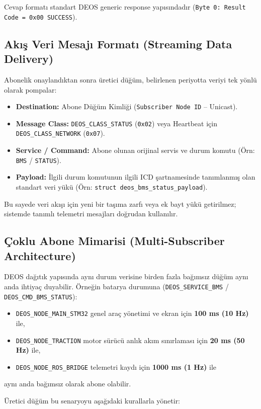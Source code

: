 \documentclass[a4paper,10pt]{article}
\newcommand{\hex}[1]{\texttt{0x#1}}
\newcommand{\code}[1]{\texttt{#1}}
\begin{document}
Cevap formatı standart DEOS generic response yapısındadır (\code{Byte 0: Result Code = 0x00 SUCCESS}).

\subsection{Akış Veri Mesajı Formatı (Streaming Data Delivery)}

Abonelik onaylandıktan sonra üretici düğüm, belirlenen periyotta veriyi tek yönlü olarak pompalar:
\begin{itemize}
    \item \textbf{Destination:} Abone Düğüm Kimliği (\code{Subscriber Node ID} -- Unicast).
    \item \textbf{Message Class:} \code{DEOS\_CLASS\_STATUS} (\hex{02}) veya Heartbeat için \code{DEOS\_CLASS\_NETWORK} (\hex{07}).
    \item \textbf{Service / Command:} Abone olunan orijinal servis ve durum komutu (Örn: \code{BMS} / \code{STATUS}).
    \item \textbf{Payload:} İlgili durum komutunun ilgili ICD şartnamesinde tanımlanmış olan standart veri yükü (Örn: \code{struct deos\_bms\_status\_payload}).
\end{itemize}

Bu sayede veri akışı için yeni bir taşıma zarfı veya ek bayt yükü getirilmez; sistemde tanımlı telemetri mesajları doğrudan kullanılır.

\subsection{Çoklu Abone Mimarisi (Multi-Subscriber Architecture)}

DEOS dağıtık yapısında aynı durum verisine birden fazla bağımsız düğüm aynı anda ihtiyaç duyabilir.
Örneğin batarya durumuna (\code{DEOS\_SERVICE\_BMS} / \code{DEOS\_CMD\_BMS\_STATUS}):
\begin{itemize}
    \item \code{DEOS\_NODE\_MAIN\_STM32} genel araç yönetimi ve ekran için \textbf{100 ms (10 Hz)} ile,
    \item \code{DEOS\_NODE\_TRACTION} motor sürücü anlık akım sınırlaması için \textbf{20 ms (50 Hz)} ile,
    \item \code{DEOS\_NODE\_ROS\_BRIDGE} telemetri kaydı için \textbf{1000 ms (1 Hz)} ile
\end{itemize}
aynı anda bağımsız olarak abone olabilir.

Üretici düğüm bu senaryoyu aşağıdaki kurallarla yönetir:
\end{document}
